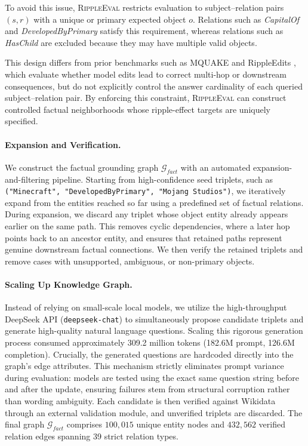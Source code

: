 To avoid this issue, \textsc{RippleEval} restricts evaluation to subject--relation pairs $(s,r)$ with a unique or primary expected object $o$. Relations such as \textit{CapitalOf} and \textit{DevelopedByPrimary} satisfy this requirement, whereas relations such as \textit{HasChild} are excluded because they may have multiple valid objects. 

This design differs from prior benchmarks such as MQUAKE \cite{zhong2023mquake} and RippleEdits \cite{cohen2023ripple}, which evaluate whether model edits lead to correct multi-hop or downstream consequences, but do not explicitly control the answer cardinality of each queried subject--relation pair. By enforcing this constraint, \textsc{RippleEval} can construct controlled factual neighborhoods whose ripple-effect targets are uniquely specified.


\paragraph{Expansion and Verification.}
We construct the factual grounding graph $\mathcal{G}_{fact}$ with an automated expansion-and-filtering pipeline. Starting from high-confidence seed triplets, such as \texttt{("Minecraft", "DevelopedByPrimary", "Mojang Studios")}, we iteratively expand from the entities reached so far using a predefined set of factual relations. During expansion, we discard any triplet whose object entity already appears earlier on the same path. This removes cyclic dependencies, where a later hop points back to an ancestor entity, and ensures that retained paths represent genuine downstream factual connections. We then verify the retained triplets and remove cases with unsupported, ambiguous, or non-primary objects.

\paragraph{Scaling Up Knowledge Graph.}
Instead of relying on small-scale local models, we utilize the high-throughput DeepSeek API (\texttt{deepseek-chat}) to simultaneously propose candidate triplets and generate high-quality natural language questions. Scaling this rigorous generation process consumed approximately 309.2 million tokens (182.6M prompt, 126.6M completion). Crucially, the generated questions are hardcoded directly into the graph's edge attributes. This mechanism strictly eliminates prompt variance during evaluation: models are tested using the exact same question string before and after the update, ensuring failures stem from structural corruption rather than wording ambiguity. Each candidate is then verified against Wikidata \cite{vrandecic2014wikidata} through an external validation module, and unverified triplets are discarded. The final graph $\mathcal{G}_{fact}$ comprises $100,015$ unique entity nodes and $432,562$ verified relation edges spanning 39 strict relation types.

